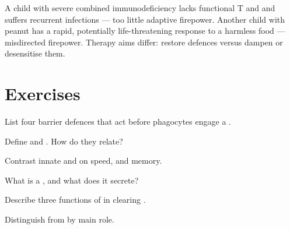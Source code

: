 \begin{example}
\label{ex:g12:immunity:balance}
A child with severe combined immunodeficiency lacks functional T and  and suffers recurrent infections --- too little adaptive firepower.
Another child with peanut  has a rapid, potentially life-threatening
response to a harmless food  --- misdirected firepower. Therapy aims
differ: restore defences versus dampen or desensitise them.
\end{example}

\section{Exercises}

\begin{exercise}[$\star$]\label{exo:g12:immunity:1}
List four barrier defences that act before phagocytes engage a .
\end{exercise}

\begin{exercise}[$\star$]\label{exo:g12:immunity:2}
Define  and . How do they relate?
\end{exercise}

\begin{exercise}[$\star$]\label{exo:g12:immunity:3}
Contrast innate and  on speed,  and memory.
\end{exercise}

\begin{exercise}[$\star$]\label{exo:g12:immunity:4}
What is a , and what does it secrete?
\end{exercise}

\begin{exercise}[$\star\star$]\label{exo:g12:immunity:5}
Describe three functions of  in clearing .
\end{exercise}

\begin{exercise}[$\star\star$]\label{exo:g12:immunity:6}
Distinguish  from  by main role.
\end{exercise}

